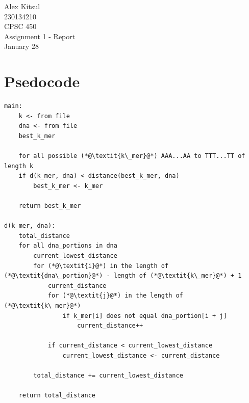 \documentclass{article}
\begin{document}
\thispagestyle{empty}
\begin{center}
\vspace*{\fill}
\Huge Alex Kitsul\\
\Huge 230134210\\
\Huge CPSC 450\\
\Huge Assignment 1 - Report\\
\Huge January 28\\
\vspace*{\fill}
\end{center}
\pagebreak

\section*{Psedocode}
\begin{lstlisting}
main:
	k <- from file
	dna <- from file
	best_k_mer
	
	for all possible (*@\textit{k\_mer}@*) AAA...AA to TTT...TT of length k
	if d(k_mer, dna) < distance(best_k_mer, dna)
		best_k_mer <- k_mer
		
	return best_k_mer
	
d(k_mer, dna):
	total_distance
	for all dna_portions in dna
		current_lowest_distance
		for (*@\textit{i}@*) in the length of (*@\textit{dna\_portion}@*) - length of (*@\textit{k\_mer}@*) + 1
			current_distance
			for (*@\textit{j}@*) in the length of (*@\textit{k\_mer}@*)
				if k_mer[i] does not equal dna_portion[i + j]
					current_distance++
				
			if current_distance < current_lowest_distance
				current_lowest_distance <- current_distance
				
		total_distance += current_lowest_distance
		
	return total_distance
\end{lstlisting}

\pagebreak
\end{document}
